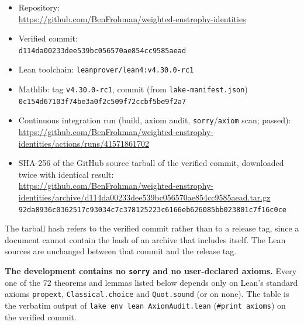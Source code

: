 \documentclass[11pt]{article}
\begin{document}
{\raggedright
\begin{itemize}
\item Repository:\\ {\footnotesize\url{https://github.com/BenFrohman/weighted-enstrophy-identities}}
\item Verified commit:\\ {\footnotesize\texttt{d114da00233dee539bc056570ae854cc9585aead}}
\item Lean toolchain: \texttt{leanprover/lean4:v4.30.0-rc1}
\item Mathlib: tag \texttt{v4.30.0-rc1}, commit (from \texttt{lake-manifest.json})\\ {\footnotesize\texttt{0c154d67103f74be3a0f2c509f72ccbf5be9f2a7}}
\item Continuous integration run (build, axiom audit, \texttt{sorry}/\texttt{axiom} scan; passed):\\ {\footnotesize\url{https://github.com/BenFrohman/weighted-enstrophy-identities/actions/runs/41571861702}}
\item SHA-256 of the GitHub source tarball of the verified commit, downloaded twice with identical result:\\ {\footnotesize\url{https://github.com/BenFrohman/weighted-enstrophy-identities/archive/d114da00233dee539bc056570ae854cc9585aead.tar.gz}}\\
{\footnotesize\texttt{92da8936c0362517c93034c7c378125223c6166eb626085bb023801c7f16c0ce}}
\end{itemize}\par}

The tarball hash refers to the verified commit rather than to a release tag, since a document cannot contain the hash of an archive that includes itself. The Lean sources are unchanged between that commit and the release tag.

\textbf{The development contains no \texttt{sorry} and no user-declared axioms.} Every one of the 72 theorems and lemmas listed below depends only on Lean's standard axioms \texttt{propext}, \texttt{Classical.choice} and \texttt{Quot.sound} (or on none). The table is the verbatim output of \texttt{lake env lean AxiomAudit.lean} (\texttt{\#print axioms}) on the verified commit.
\end{document}

